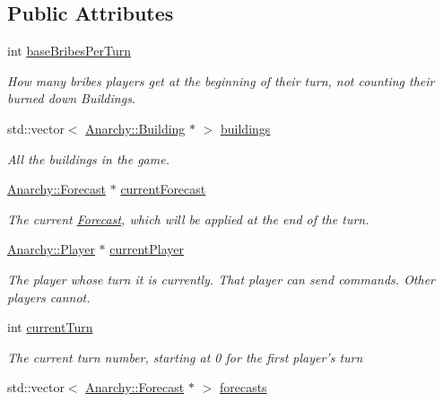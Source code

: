 \subsection*{Public Attributes}
\begin{DoxyCompactItemize}
\item 
int \hyperlink{classAnarchy_1_1Game_a32c7550663b124a3c3f9f854d0ed0a72}{base\-Bribes\-Per\-Turn}
\begin{DoxyCompactList}\small\item\em How many bribes players get at the beginning of their turn, not counting their burned down Buildings. \end{DoxyCompactList}\item 
std\-::vector$<$ \hyperlink{classAnarchy_1_1Building}{Anarchy\-::\-Building} $\ast$ $>$ \hyperlink{classAnarchy_1_1Game_afed9b69dccd790514505d662b84d5573}{buildings}
\begin{DoxyCompactList}\small\item\em All the buildings in the game. \end{DoxyCompactList}\item 
\hyperlink{classAnarchy_1_1Forecast}{Anarchy\-::\-Forecast} $\ast$ \hyperlink{classAnarchy_1_1Game_a4429e9c4a6613416867b241c37616562}{current\-Forecast}
\begin{DoxyCompactList}\small\item\em The current \hyperlink{classAnarchy_1_1Forecast}{Forecast}, which will be applied at the end of the turn. \end{DoxyCompactList}\item 
\hyperlink{classAnarchy_1_1Player}{Anarchy\-::\-Player} $\ast$ \hyperlink{classAnarchy_1_1Game_ab9c7ef6e3dc9841ebfd6e30423d31677}{current\-Player}
\begin{DoxyCompactList}\small\item\em The player whose turn it is currently. That player can send commands. Other players cannot. \end{DoxyCompactList}\item 
int \hyperlink{classAnarchy_1_1Game_a5ce8941697b3ca1e33d4a98b33a9c797}{current\-Turn}
\begin{DoxyCompactList}\small\item\em The current turn number, starting at 0 for the first player's turn \end{DoxyCompactList}\item 
std\-::vector$<$ \hyperlink{classAnarchy_1_1Forecast}{Anarchy\-::\-Forecast} $\ast$ $>$ \hyperlink{classAnarchy_1_1Game_a756081a4d3d50cc285d0fac27eea7c5d}{forecasts}

\end{DoxyCompactItemize}
